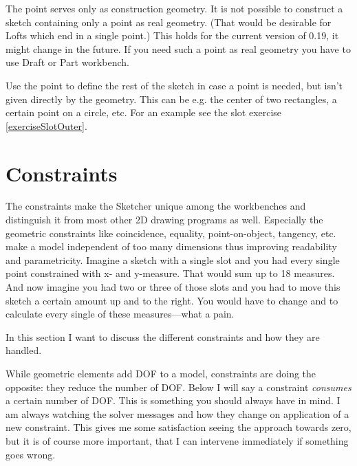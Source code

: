 \documentclass[12pt,titlepage]{article}
\let\partOrigin\part
\renewcommand\part{\newpage\partOrigin}
\begin{document}
The point serves only as construction geometry. It is not possible to construct a
sketch containing only a point as real geometry. (That would be desirable for
Lofts which end in a single point.) This holds for the current version
of 0.19, it might change in the future. If you need such a point as real
geometry you have to use Draft or Part workbench.

Use the point to define the rest of the sketch in case a point is needed, but isn't
given directly by the geometry. This can be e.g. the center of two rectangles,
a certain point on a circle, etc. For an example see the slot exercise
\vref{exerciseSlotOuter}.

\newpage

\part{Constraints}
\label{Constraints}
The constraints make the Sketcher unique among the workbenches and
distinguish it from most other 2D drawing programs as well. Especially the geometric
constraints like coincidence, equality, point-on-object, tangency, etc. make a model
independent of too many dimensions thus improving readability and parametricity.
Imagine a sketch with a single slot and you had every single point constrained with
x- and y-measure. That would sum up to 18 measures. And now imagine you had two or
three of those slots and you had to move this sketch a certain amount up and to the
right. You would have to change and to calculate every single of these measures---what a pain.

In this section I want to discuss the different constraints and how they are handled.

While geometric elements add DOF to a model, constraints are doing the opposite: they
reduce the number of DOF. Below I will say a constraint \emph{consumes} a
certain number of DOF. This is something you should always have in mind. I am
always watching the solver messages and how they change on application of a new
constraint. This gives me some satisfaction seeing the approach towards zero, but
it is of course more important, that I can intervene immediately if something goes wrong.
\end{document}
